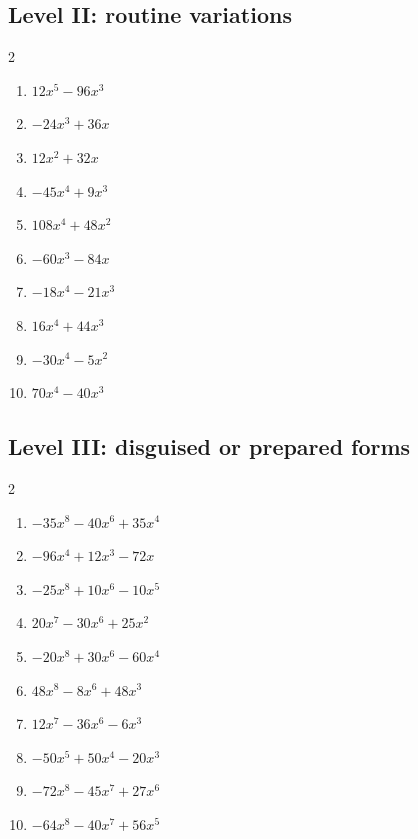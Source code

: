\documentclass[11pt,oneside]{book}
\begin{document}
\subsection*{Level II: routine variations}
\begin{multicols}{2}
\begin{enumerate}[leftmargin=*,label=\textbf{\arabic*.},itemsep=0.65\baselineskip]
\item $ 12 x^{5} - 96 x^{3} $
\item $ - 24 x^{3} + 36 x $
\item $ 12 x^{2} + 32 x $
\item $ - 45 x^{4} + 9 x^{3} $
\item $ 108 x^{4} + 48 x^{2} $
\item $ - 60 x^{3} - 84 x $
\item $ - 18 x^{4} - 21 x^{3} $
\item $ 16 x^{4} + 44 x^{3} $
\item $ - 30 x^{4} - 5 x^{2} $
\item $ 70 x^{4} - 40 x^{3} $
\end{enumerate}
\end{multicols}
\subsection*{Level III: disguised or prepared forms}
\begin{multicols}{2}
\begin{enumerate}[leftmargin=*,label=\textbf{\arabic*.},itemsep=0.65\baselineskip]
\item $ - 35 x^{8} - 40 x^{6} + 35 x^{4} $
\item $ - 96 x^{4} + 12 x^{3} - 72 x $
\item $ - 25 x^{8} + 10 x^{6} - 10 x^{5} $
\item $ 20 x^{7} - 30 x^{6} + 25 x^{2} $
\item $ - 20 x^{8} + 30 x^{6} - 60 x^{4} $
\item $ 48 x^{8} - 8 x^{6} + 48 x^{3} $
\item $ 12 x^{7} - 36 x^{6} - 6 x^{3} $
\item $ - 50 x^{5} + 50 x^{4} - 20 x^{3} $
\item $ - 72 x^{8} - 45 x^{7} + 27 x^{6} $
\item $ - 64 x^{8} - 40 x^{7} + 56 x^{5} $
\end{enumerate}
\end{multicols}
\end{document}
